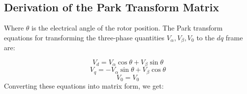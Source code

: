 \subsection{Derivation of the Park Transform Matrix}

\noindent
Where \( \theta \) is the electrical angle of the rotor position.
\noindent
The Park transform equations for transforming the three-phase quantities \(
V_\alpha, V_\beta, V_0 \) to the \( dq \) frame are:

\begin{equation*}
    V_d = V_\alpha \cos \theta + V_\beta \sin \theta
\end{equation*}
\begin{equation*}
    V_q = -V_\alpha \sin \theta + V_\beta \cos \theta
\end{equation*}
\begin{equation*}
    V_0 = V_0
\end{equation*}
\noindent
Converting these equations into matrix form, we get:

